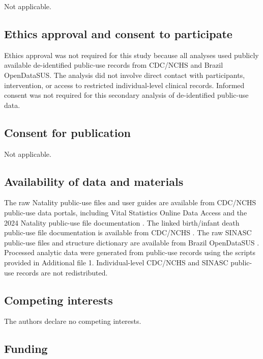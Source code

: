 \documentclass[pdflatex,sn-vancouver-num]{sn-jnl}
\begin{document}
Not applicable.

\subsection*{Ethics approval and consent to participate}

Ethics approval was not required for this study because all analyses used publicly available de-identified public-use records from CDC/NCHS and Brazil OpenDataSUS. The analysis did not involve direct contact with participants, intervention, or access to restricted individual-level clinical records. Informed consent was not required for this secondary analysis of de-identified public-use data.

\subsection*{Consent for publication}

Not applicable.

\subsection*{Availability of data and materials}

The raw Natality public-use files and user guides are available from CDC/NCHS public-use data portals, including Vital Statistics Online Data Access and the 2024 Natality public-use file documentation \cite{nchs_vitalstats_online,nchs_natality_2024_userguide}. The linked birth/infant death public-use file documentation is available from CDC/NCHS \cite{nchs_linked_2024_userguide}. The raw SINASC public-use files and structure dictionary are available from Brazil OpenDataSUS \cite{opendatasus_sinasc,sinasc_structure_dictionary}. Processed analytic data were generated from public-use records using the scripts provided in Additional file 1. Individual-level CDC/NCHS and SINASC public-use records are not redistributed.

\subsection*{Competing interests}

The authors declare no competing interests.

\subsection*{Funding}
\end{document}
